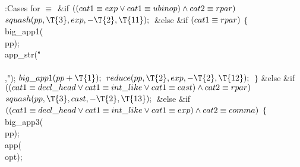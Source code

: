 \B{}:Cases for \X${}\equiv{}$\6
\&{if} ${}((\\{cat1}\equiv\\{exp}\lor\\{cat1}\equiv\\{ubinop})\land\\{cat2}\equiv\\{rpar}){}$\1\5
${}\\{squash}(\\{pp},\39\T{3},\39\\{exp},\39{-}\T{2},\39\T{11});{}$\2\6
\&{else} \&{if} ${}(\\{cat1}\equiv\\{rpar}){}$\5
${}\{{}$\1\6
\\{big\_app1}(\\{pp});\6
\\{app\_str}(\.{"\\\\,"});\6
${}\\{big\_app1}(\\{pp}+\T{1});{}$\6
${}\\{reduce}(\\{pp},\39\T{2},\39\\{exp},\39{-}\T{2},\39\T{12});{}$\6
\4${}\}{}$\2\6
\&{else} \&{if} ${}((\\{cat1}\E\\{decl\_head}\V\\{cat1}\E\\{int\_like}\V%
\\{cat1}\E\\{cast})\W\\{cat2}\E\\{rpar}){}$\1\5
${}\\{squash}(\\{pp},\39\T{3},\39\\{cast},\39{-}\T{2},\39\T{13});{}$\2\6
\&{else} \&{if} ${}((\\{cat1}\E\\{decl\_head}\V\\{cat1}\E\\{int\_like}\V%
\\{cat1}\E\\{exp})\W\\{cat2}\E\\{comma}){}$\5
${}\{{}$\1\6
\\{big\_app3}(\\{pp});\6
\\{app}(\\{opt});\6

